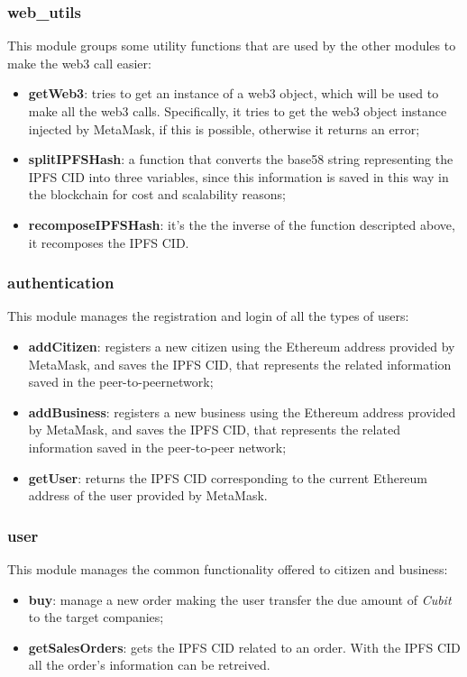 \subsubsection{web\_utils}
This module groups some utility functions that are used by the other modules to make the web3 call easier:
\begin{itemize}
	\item \textbf{getWeb3}: tries to get an instance of a web3 object, which will be used to make all the web3 calls. Specifically, it tries to get the web3 object instance injected by MetaMask, if this is possible, otherwise it returns an error;
	\item \textbf{splitIPFSHash}: a function that converts the base58 string representing the IPFS CID into three variables, since this information is saved in this way in the blockchain for cost and scalability reasons;
	\item \textbf{recomposeIPFSHash}: it's the the inverse of the function descripted above, it recomposes the IPFS CID.
\end{itemize} 

\subsubsection{authentication\glo}
This module manages the registration and login of all the types of users:
\begin{itemize}
	\item \textbf{addCitizen}: registers a new citizen using the Ethereum address provided by MetaMask, and saves the IPFS CID, that represents the related information saved in the peer-to-peer\glosp network;
	\item \textbf{addBusiness}: registers a new business using the Ethereum address provided by MetaMask, and saves the IPFS CID, that represents the related information saved in the peer-to-peer network;
	\item \textbf{getUser}: returns the IPFS CID corresponding to the current Ethereum address of the user provided by MetaMask.
\end{itemize}
\subsubsection{user}
This module manages the common functionality offered to citizen and business:
\begin{itemize}
	\item \textbf{buy}: manage a new order making the user transfer the due amount of \textit{Cubit} to the target companies;
	\item \textbf{getSalesOrders}: gets the IPFS CID related to an order. With the IPFS CID all the order's information can be retreived.
\end{itemize}
